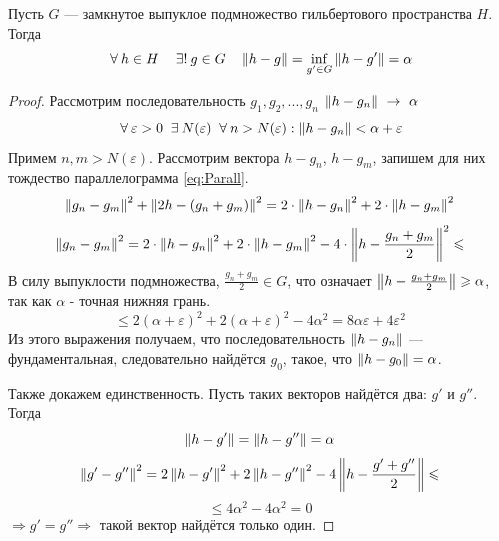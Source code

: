\documentclass[12pt]{article}
\begin{document}
			\begin{theorem}
				Пусть $G$ --- замкнутое выпуклое подмножество гильбертового пространства $H$. Тогда
				$$\forall h \in H \quad \existsonly g \in G \quad \norm{h-g} = \underset{g' \in G}{\inf} \norm{h-g'} = \alpha$$
			\end{theorem}
			\begin{proof}
				Рассмотрим последовательность $g_1, g_2, ..., g_n$ $\left\| h - g_n \right\|~\rightarrow~\alpha$
				$$\forall \varepsilon > 0 ~ \exists N(\varepsilon) ~ \forall n > N(\varepsilon): \norm{h - g_n} < \alpha + \varepsilon$$
				Примем $n, m > N(\varepsilon)$. Рассмотрим вектора $h - g_n$, $h - g_m$, запишем для них тождество параллелограмма \ref{eq:Parall}.
				$$\left\| g_n - g_m \right\|^2 + \left\| 2h - (g_n + g_m) \right\|^2 = 2 \cdot \left\| h - g_n \right\|^2 + 2 \cdot \left\| h - g_m \right\|^2$$
				$$\left\| g_n - g_m \right\|^2 = 2 \cdot \left\| h - g_n \right\|^2 + 2 \cdot \left\| h - g_m \right\|^2 - 4 \cdot \left\| h - \frac{g_n + g_m}{2} \right\|^2 \leqslant$$
				В силу выпуклости подмножества, $\frac{g_n + g_m}{2} \in G$, что означает $\left\| h - \frac{g_n + g_m}{2} \right\| \geqslant \alpha$, так
				как $\alpha$ - точная нижняя грань.
				$$\leq 2 (\alpha + \varepsilon)^2 + 2 (\alpha + \varepsilon)^2 - 4 \alpha^2 = 8 \alpha \varepsilon + 4 \varepsilon^2$$
				Из этого выражения получаем, что последовательность $\left\| h - g_n \right\|$ --- фундаментальная, следовательно найдётся $g_0$, такое,
				что $\left\| h - g_0 \right\| = \alpha$.
		
				Также докажем единственность. Пусть таких векторов найдётся два: $g'$ и $g''$. Тогда
				$$\left\| h - g' \right\| = \left\| h - g'' \right\| = \alpha$$
				$$\left\| g' - g'' \right\|^2 = 2 \left\| h - g' \right\|^2 + 2 \left\| h - g'' \right\|^2 - 4 \left\| h - \frac{g' + g''}{2} \right\| \leqslant$$
				$$\leq 4 \alpha^2 - 4 \alpha^2 = 0$$
				$\Rightarrow g' = g'' \Rightarrow$ такой вектор найдётся только один.
			\end{proof}

\end{document}
